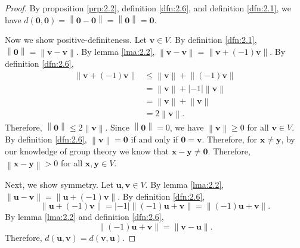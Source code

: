 \documentclass[11pt, letterpaper]{report}
\begin{document}
\begin{proof}
	By proposition \ref{prp:2.2}, definition \ref{dfn:2.6}, and definition \ref{dfn:2.1}, we have $d(\mathbf{0},\mathbf{0})=\left\lVert \mathbf{0}-\mathbf{0} \right\rVert =\left\lVert \mathbf{0} \right\rVert =\mathbf{0}$.

	Now we show positive-definiteness. Let $\mathbf{v}\in V$. By definition \ref{dfn:2.1}, $\left\lVert \mathbf{0} \right\rVert =\left\lVert \mathbf{v}-\mathbf{v} \right\rVert $. By lemma \ref{lma:2.2}, $\left\lVert \mathbf{v}-\mathbf{v} \right\rVert =\left\lVert \mathbf{v}+(-1)\mathbf{v} \right\rVert $. By definition \ref{dfn:2.6},
	\begin{align*}
		\left\lVert \mathbf{v}+(-1)\mathbf{v} \right\rVert &\leq \left\lVert \mathbf{v} \right\rVert +\left\lVert (-1)\mathbf{v} \right\rVert \\
								   &=\left\lVert \mathbf{v} \right\rVert +\left| -1 \right| \left\lVert \mathbf{v} \right\rVert \\
								   &=\left\lVert \mathbf{v} \right\rVert +\left\lVert \mathbf{v} \right\rVert \\
								   &=2\left\lVert \mathbf{v} \right\rVert 
	.\end{align*}
	Therefore, $\left\lVert \mathbf{0} \right\rVert \leq 2\left\lVert \mathbf{v} \right\rVert $. Since $\left\lVert \mathbf{0} \right\rVert =0$, we have $\left\lVert \mathbf{v} \right\rVert \geq 0$ for all $\mathbf{v}\in V$. By definition \ref{dfn:2.6}, $\left\lVert \mathbf{v} \right\rVert =\mathbf{0}$ if and only if $\mathbf{0}=\mathbf{v}$. Therefore, for $\mathbf{x}\neq \mathbf{y}$, by our knowledge of group theory we know that $\mathbf{x}-\mathbf{y}\neq \mathbf{0}$. Therefore, $\left\lVert \mathbf{x}-\mathbf{y} \right\rVert >0$ for all $\mathbf{x},\mathbf{y}\in V$.

	Next, we show symmetry. Let $\mathbf{u},\mathbf{v}\in V$. By lemma \ref{lma:2.2}, $\left\lVert \mathbf{u}-\mathbf{v} \right\rVert =\left\lVert \mathbf{u}+(-1)\mathbf{v} \right\rVert $. By definition \ref{dfn:2.6},
	\[
		\left\lVert \mathbf{u}+(-1)\mathbf{v} \right\rVert =\left| -1 \right| \left\lVert (-1)\mathbf{u}+\mathbf{v} \right\rVert =\left\lVert (-1)\mathbf{u}+\mathbf{v} \right\rVert 
	.\]
	By lemma \ref{lma:2.2} and definition \ref{dfn:2.6},
	\[
		\left\lVert (-1)\mathbf{u}+\mathbf{v} \right\rVert =\left\lVert \mathbf{v}-\mathbf{u} \right\rVert 
	.\]
	Therefore, $d(\mathbf{u},\mathbf{v})=d(\mathbf{v},\mathbf{u})$.


\end{proof}
\end{document}
